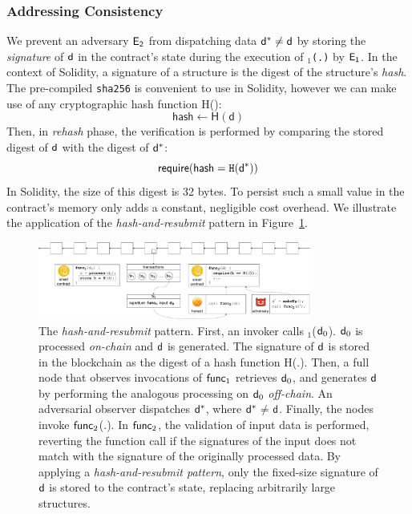 \subsubsection{Addressing Consistency} We prevent an adversary $\mathsf{E_{2}}$
from dispatching data $\mathsf{d^*}\neq\mathsf{d}$ by storing the \emph{signature} of
$\mathsf{d}$ in the contract's state during the execution of \texttt{\proc$_1$(.)} by
$\mathsf{E_{1}}$. In the context of Solidity, a signature of a structure is the
digest of the structure's \emph{hash}. The pre-compiled \texttt{sha256} is
convenient to use in Solidity, however we can make use of any cryptographic
hash function \textsf{H()}: \[\textsf{hash} \gets \textsf{H}(\textsf{d})\]
Then, in \emph{rehash} phase, the verification is performed by comparing the
stored digest of $\mathsf{d}$ with the digest of $\mathsf{d^*}$:
\[\textsf{require}(\textsf{hash} = \texttt{H}(\mathsf{d^*}))\] \noindent In Solidity,
the size of this digest is 32 bytes. To persist such a small value in the
contract's memory only adds a constant, negligible cost overhead. We illustrate
the application of the \emph{hash-and-resubmit} pattern in
Figure~\ref{fig:har-pattern}.

\begin{figure}[h]
    \begin{center} \includegraphics[width=0.8\textwidth]{figures/har-pattern.pdf}
    \end{center}

    \caption{The \emph{hash-and-resubmit} pattern. First, an invoker calls
        \proc$_1$($\mathsf{d}_0$). $\mathsf{d}_0$ is processed \emph{on-chain} and
        $\mathsf{d}$ is generated. The signature of $\mathsf{d}$ is stored in the
        blockchain as the digest of a hash function \textsf{H}(.). Then,
        a full node that observes invocations of $\textsf{func}_1$ retrieves $\mathsf{d}_0$,
        and generates $\mathsf{d}$ by performing the analogous processing on
        $\mathsf{d}_0$ \emph{off-chain}. An adversarial observer dispatches
        $\mathsf{d^*}$, where $\mathsf{d^*}$$\neq$$\mathsf{d}$. Finally, the nodes invoke
        $\textsf{func}_2$(.). In $\textsf{func}_2$, the validation of input data is performed,
        reverting the function call if the signatures of the input does not
        match with the signature of the originally processed data. By applying
        a \emph{hash-and-resubmit pattern}, only the fixed-size signature of
        $\mathsf{d}$ is stored to the contract's state, replacing arbitrarily large
        structures.}

        \label{fig:har-pattern}
\end{figure}


